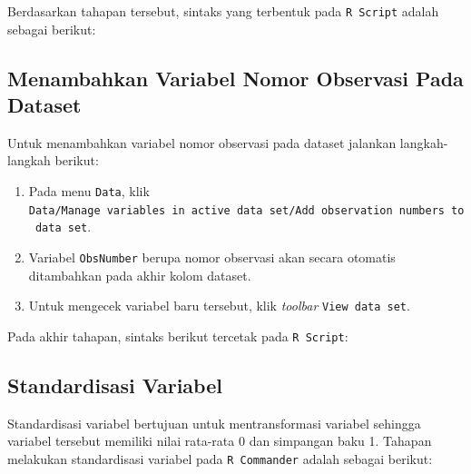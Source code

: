 \documentclass[12pt,]{krantz}
\newenvironment{Shaded}{\begin{snugshade}}{\end{snugshade}}
\newcommand{\DecValTok}[1]{\textcolor[rgb]{0.00,0.00,0.81}{#1}}
\newcommand{\KeywordTok}[1]{\textcolor[rgb]{0.13,0.29,0.53}{\textbf{#1}}}
\newcommand{\NormalTok}[1]{#1}
\newcommand{\OperatorTok}[1]{\textcolor[rgb]{0.81,0.36,0.00}{\textbf{#1}}}
\newcommand{\StringTok}[1]{\textcolor[rgb]{0.31,0.60,0.02}{#1}}
\providecommand{\tightlist}{%
  \setlength{\itemsep}{0pt}\setlength{\parskip}{0pt}}
\begin{document}
Berdasarkan tahapan tersebut, sintaks yang terbentuk pada \texttt{R\ Script} adalah sebagai berikut:

\begin{Shaded}
\end{Shaded}

\hypertarget{menambahkan-variabel-nomor-observasi-pada-dataset}{%
\subsection{Menambahkan Variabel Nomor Observasi Pada Dataset}\label{menambahkan-variabel-nomor-observasi-pada-dataset}}

Untuk menambahkan variabel nomor observasi pada dataset jalankan langkah-langkah berikut:

\begin{enumerate}
\def\labelenumi{\arabic{enumi}.}
\tightlist
\item
  Pada menu \texttt{Data}, klik \texttt{Data/Manage\ variables\ in\ active\ data\ set/Add\ observation\ numbers\ to\ data\ set}.
\item
  Variabel \texttt{ObsNumber} berupa nomor observasi akan secara otomatis ditambahkan pada akhir kolom dataset.
\item
  Untuk mengecek variabel baru tersebut, klik \emph{toolbar} \texttt{View\ data\ set}.
\end{enumerate}

Pada akhir tahapan, sintaks berikut tercetak pada \texttt{R\ Script}:

\begin{Shaded}
\end{Shaded}

\hypertarget{standardisasi-variabel}{%
\subsection{Standardisasi Variabel}\label{standardisasi-variabel}}

Standardisasi variabel bertujuan untuk mentransformasi variabel sehingga variabel tersebut memiliki nilai rata-rata 0 dan simpangan baku 1. Tahapan melakukan standardisasi variabel pada \texttt{R\ Commander} adalah sebagai berikut:
\end{document}
